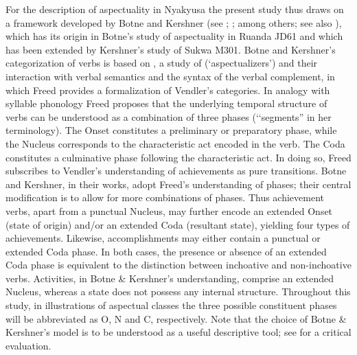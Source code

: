 For the description of aspectuality in Nyakyusa the present study thus draws on a framework developed by Botne and Kershner (see \citealt{BotneR1983}; \citealt{KershnerT2002}; \citealt{BotneRKershnerT2008} among others; see also ), which has its origin in Botne's study of aspectuality in Ruanda JD61 and which has been extended by Kershner's study of Sukwa M301. Botne and Kershner's categorization of verbs is based on \citet{FreedA1979}, a study of   (\lq aspectualizers') and their interaction with verbal semantics and the syntax of the verbal complement, in which Freed provides a formalization of Vendler's categories. In analogy with syllable phonology Freed proposes that the underlying temporal structure of verbs can be understood as a combination of three phases (\lq\lq segments'' in her terminology). The Onset constitutes a preliminary or preparatory phase, while the Nucleus corresponds to the characteristic act encoded in the verb. The Coda constitutes a culminative phase following the characteristic act. In doing so, Freed subscribes to Vendler's understanding of achievements as pure transitions. Botne and Kershner, in their works, adopt Freed's understanding of phases; their central modification is to allow for more combinations of phases. Thus achievement verbs, apart from a punctual Nucleus, may further encode an extended Onset (state of origin) and/or an extended Coda (resultant state), yielding four types of achievements. Likewise, accomplishments may either contain a punctual or extended Coda phase. In both cases, the presence or absence of an extended Coda phase is equivalent to the distinction between inchoative and non-inchoative verbs. Activities, in Botne \& Kershner's understanding, comprise an extended Nucleus, whereas a state does not possess any internal structure. Throughout this study, in illustrations of aspectual classes the three possible constituent phases will be abbreviated as O, N and C, respectively. Note that the choice of Botne \& Kershner's model is to be understood as a useful descriptive tool; see \citet{PersohnB2017b} for a critical evaluation.   

